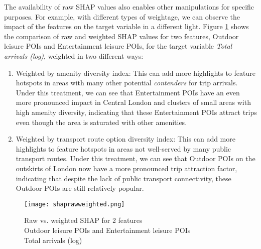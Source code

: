 The availability of raw SHAP values also enables other manipulations for specific purposes. For example, with different types of weightage, we can observe the impact of the features on the target variable in a different light. Figure \ref{fig:shaprawweighted} shows the comparison of raw and weighted SHAP values for two features, Outdoor leisure POIs and Entertainment leisure POIs, for the target variable \textit{Total arrivals (log)}, weighted in two different ways:

\begin{enumerate}
    \setlength\itemsep{0em}
    \item Weighted by amenity diversity index: This can add more highlights to feature hotspots in areas with many other potential \textit{contenders} for trip arrivals. Under this treatment, we can see that Entertainment POIs have an even more pronounced impact in Central London and clusters of small areas with high amenity diversity, indicating that these Entertainment POIs attract trips even though the area is saturated with other amenities.
    \item Weighted by transport route option diversity index: This can add more highlights to feature hotspots in areas not well-served by many public transport routes. Under this treatment, we can see that Outdoor POIs on the outskirts of London now have a more pronounced trip attraction factor, indicating that despite the lack of public transport connectivity, these Outdoor POIs are still relatively popular.
\end{enumerate}

\begin{figure}[!hbt]
    \centering
    \texttt{[image: shaprawweighted.png]}
    \captionsetup{justification=centering}
    \caption{Raw vs. weighted SHAP for 2 features\\Outdoor leisure POIs and Entertainment leisure POIs \\Total arrivals (log)}
    \label{fig:shaprawweighted}
\end{figure}

